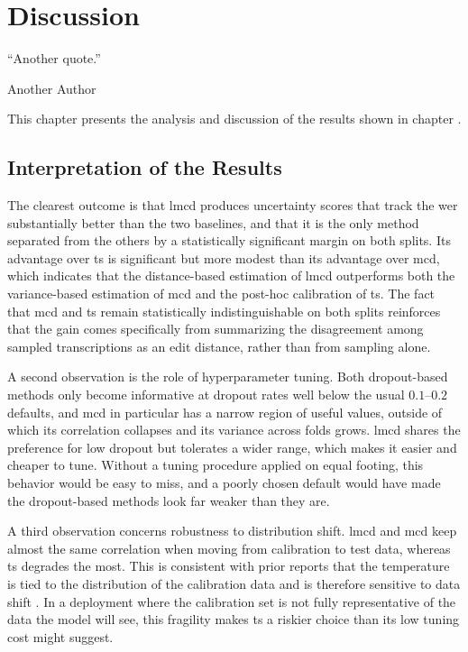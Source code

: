 
\chapter{Discussion}
\epigraph{``Another quote.''}{\vspace{10pt}Another Author}
\label{chapter:discussion}

\newpage

This chapter presents the analysis and discussion of the results shown in chapter .

\section{Interpretation of the Results}

The clearest outcome is that \acrshort{lmcd} produces uncertainty scores that track the \acrshort{wer} substantially better than the two baselines, and that it is the only method separated from the others by a statistically significant margin on both splits. Its advantage over \acrshort{ts} is significant but more modest than its advantage over \acrshort{mcd}, which indicates that the distance-based estimation of \acrshort{lmcd} outperforms both the variance-based estimation of \acrshort{mcd} and the post-hoc calibration of \acrshort{ts}. The fact that \acrshort{mcd} and \acrshort{ts} remain statistically indistinguishable on both splits reinforces that the gain comes specifically from summarizing the disagreement among sampled transcriptions as an edit distance, rather than from sampling alone.

A second observation is the role of hyperparameter tuning. Both dropout-based methods only become informative at dropout rates well below the usual $0.1$--$0.2$ defaults, and \acrshort{mcd} in particular has a narrow region of useful values, outside of which its correlation collapses and its variance across folds grows. \acrshort{lmcd} shares the preference for low dropout but tolerates a wider range, which makes it easier and cheaper to tune. Without a tuning procedure applied on equal footing, this behavior would be easy to miss, and a poorly chosen default would have made the dropout-based methods look far weaker than they are.

A third observation concerns robustness to distribution shift. \acrshort{lmcd} and \acrshort{mcd} keep almost the same correlation when moving from calibration to test data, whereas \acrshort{ts} degrades the most. This is consistent with prior reports that the temperature is tied to the distribution of the calibration data and is therefore sensitive to data shift \cite{yu2022robust}\cite{mozafari2018attended}. In a deployment where the calibration set is not fully representative of the data the model will see, this fragility makes \acrshort{ts} a riskier choice than its low tuning cost might suggest.

